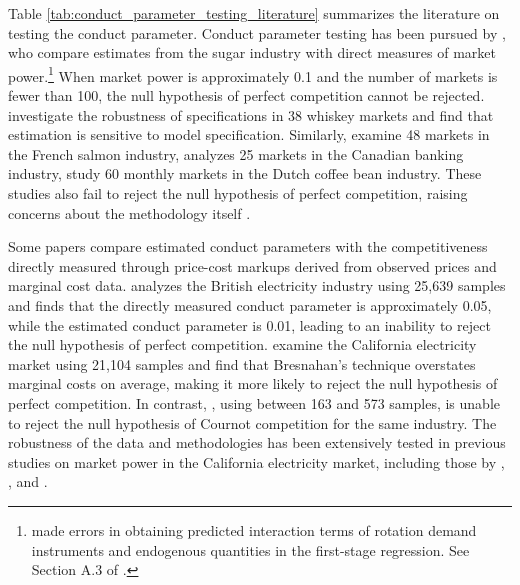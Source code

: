 \documentclass[11pt, a4paper]{article}
\begin{document}
Table \ref{tab:conduct_parameter_testing_literature} summarizes the literature on testing the conduct parameter.
Conduct parameter testing has been pursued by \cite{genesove1998testing}, who compare estimates from the sugar industry with direct measures of market power.\footnote{\cite{genesove1998testing} made errors in obtaining predicted interaction terms of rotation demand instruments and endogenous quantities in the first-stage regression. See Section A.3 of \cite{matsumura2023resolving}.} 
When market power is approximately 0.1 and the number of markets is fewer than 100, the null hypothesis of perfect competition cannot be rejected.
\cite{clay2003further} investigate the robustness of specifications in 38 whiskey markets and find that estimation is sensitive to model specification. 
Similarly, \cite{steen1999testing} examine 48 markets in the French salmon industry, \cite{shaffer1993test} analyzes 25 markets in the Canadian banking industry, \cite{bettendorf2000incomplete} study 60 monthly markets in the Dutch coffee bean industry. 
These studies also fail to reject the null hypothesis of perfect competition, raising concerns about the methodology itself \citep{shafferMarketPowerCompetition2017}.

Some papers compare estimated conduct parameters with the competitiveness directly measured through price-cost markups derived from observed prices and marginal cost data.
\cite{wolfram1999measuring} analyzes the British electricity industry using 25,639 samples and finds that the directly measured conduct parameter is approximately 0.05, while the estimated conduct parameter is 0.01, leading to an inability to reject the null hypothesis of perfect competition. 
\cite{kim2006biases} examine the California electricity market using 21,104 samples and find that Bresnahan's technique overstates marginal costs on average, making it more likely to reject the null hypothesis of perfect competition. 
In contrast, \cite{puller2007pricing}, using between 163 and 573 samples, is unable to reject the null hypothesis of Cournot competition for the same industry. 
The robustness of the data and methodologies has been extensively tested in previous studies on market power in the California electricity market, including those by \cite{borenstein2002measuring}, \cite{wolak2003measuring}, and \cite{orea2018estimating}.
\end{document}
